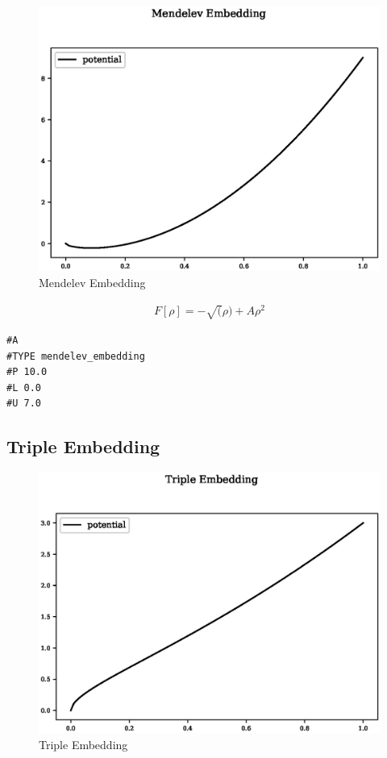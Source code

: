 \begin{figure}[h]
  \begin{center}
    \includegraphics[width=120mm]{appendix/functions/plots/mendelev_embedding.eps}
    \caption{Mendelev Embedding}
    \label{graph:MendelevEmb}
  \end{center}
\end{figure}

\begin{equation}
\begin{split}
F[\rho] = - \sqrt(\rho) + A \rho^2
\end{split}
\label{eq:mendelevEmbedding}
\end{equation}

\begin{lstlisting}[style=sPseudo,caption={Mendelev Embedding}]
#A
#TYPE mendelev_embedding
#P 10.0
#L 0.0
#U 7.0
\end{lstlisting}


\clearpage
\FloatBarrier
\subsection{Triple Embedding}

\begin{figure}[h]
  \begin{center}
    \includegraphics[width=120mm]{appendix/functions/plots/triple_embedding.eps}
    \caption{Triple Embedding}
    \label{graph:graph1}
  \end{center}
\end{figure}

